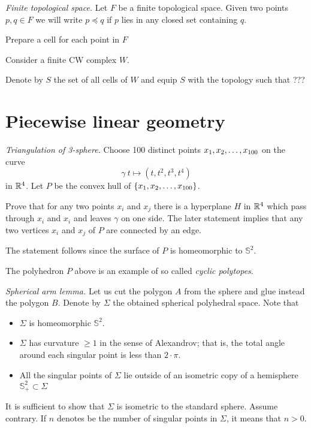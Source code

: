 \textit{Finite topological space.}
Let $F$ be a finite topological space.
Given two points $p,q\in F$ we will write $p\preccurlyeq q$ if $p$ lies in any closed set containing $q$.

Prepare a cell for each point in $F$


Consider a finite CW complex $W$.

Denote by $S$ the set of all cells of $W$
and equip $S$ with the topology  such that ???


\section*{Piecewise linear geometry}


\textit{Triangulation of 3-sphere.}
Choose 100 distinct points $x_1,x_2,\z\dots,x_{100}$
on the curve 
\[\gamma\:t\mapsto (t,t^2,t^3,t^4)\] 
in $\mathbb{R}^4$.
Let $P$ be the convex hull of $\{x_1,x_2,\z\dots,x_{100}\}$.

Prove that for any two points $x_i$ and $x_j$ there is a hyperplane $H$ in $\mathbb{R}^4$ which pass through $x_i$ and $x_i$ and leaves $\gamma$ on one side.
The later statement implies that any two vertices $x_i$ and $x_j$
of $P$ are connected by an edge.

The statement follows
since the surface of $P$ is homeomorphic to $\mathbb{S}^2$.

The polyhedron $P$ above is an example 
of so called \emph{cyclic polytopes}.

\textit{Spherical arm lemma.}
Let us cut the polygon $A$ from the sphere and glue instead the polygon $B$.
Denote by $\Sigma$ the obtained spherical polyhedral space.
Note that 
\begin{itemize}
\item $\Sigma$ is homeomorphic $\mathbb S^2$.
\item $\Sigma$ has curvature $\ge 1$ in the sense of Alexandrov; that is, the total angle around each singular point is less than $2\cdot \pi$.
\item All the singular points of $\Sigma$ 
lie outside of an isometric copy of a hemisphere $\mathbb{S}^2_+\subset \Sigma$
\end{itemize}

It is sufficient to show that $\Sigma$ is isometric to the standard sphere.
Assume contrary.
If $n$ denotes be the number of singular points in $\Sigma$, 
it means that $n>0$.

